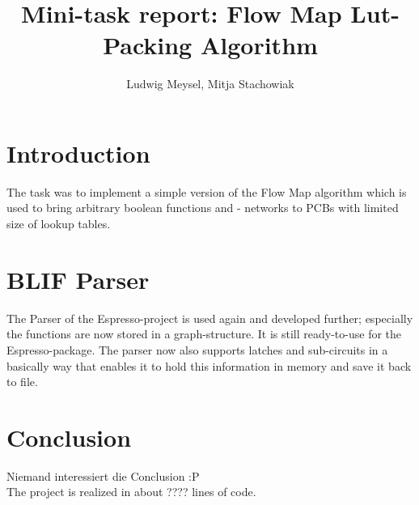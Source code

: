 \documentclass[colorback,accentcolor=tud1c,11pt]{tudreport}
\title{Mini-task report: Flow Map Lut-Packing Algorithm}
\subtitle{Ludwig Meysel, Mitja Stachowiak}
\begin{document}
\maketitle



\chapter{Introduction}
The task was to implement a simple version of the Flow Map algorithm which is used to bring arbitrary boolean functions and - networks to PCBs with limited size of lookup tables.


\chapter{BLIF Parser}
The Parser of the Espresso-project is used again and developed further; especially the functions are now stored in a graph-structure. It is still ready-to-use for the Espresso-package. The parser now also supports latches and sub-circuits in a basically way that enables it to hold this information in memory and save it back to file.


\chapter{Conclusion}
Niemand interessiert die Conclusion   :P
\\
The project is realized in about ???? lines of code.





\end{document}
